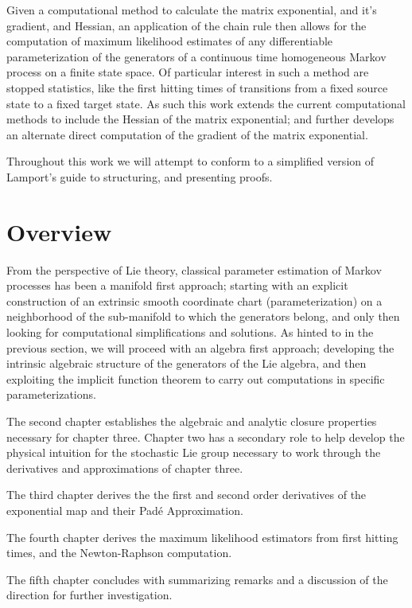 Given a computational method to calculate the matrix exponential, and it's 
gradient, and Hessian, an application of the chain rule then allows for the 
computation of maximum likelihood estimates of any differentiable
parameterization of the generators of a continuous time homogeneous Markov 
process on a finite state space. Of particular interest in such a method are stopped statistics, like the first hitting 
times of transitions from a fixed source state to a fixed target state. As such 
this work extends the current computational methods to include the Hessian of the 
matrix exponential; and further develops an alternate direct computation of the 
gradient of the matrix exponential.

Throughout this work we will attempt to conform to a simplified version of 
Lamport's guide to structuring, and presenting proofs\cite{lamport_how_2012}.
\section{Overview}
From the perspective of Lie theory, classical parameter estimation of Markov 
processes has been a manifold first approach; starting with an explicit 
construction of an extrinsic smooth coordinate chart (parameterization) on a 
neighborhood of the sub-manifold to which the generators belong, and only then 
looking for computational simplifications and solutions. As hinted to in the 
previous section, we will proceed with an algebra first approach; developing the 
intrinsic algebraic structure of the generators of the Lie algebra, and then 
exploiting the implicit function theorem to carry out computations in specific 
parameterizations.

The second chapter establishes the algebraic and analytic closure properties
necessary for chapter three. Chapter two has a secondary role to help develop the 
physical intuition for the stochastic Lie group necessary to work through the 
derivatives and approximations of chapter three.

The third chapter derives the the first and second order derivatives of the exponential
map and their Pad\'{e} Approximation.

The fourth chapter derives the maximum likelihood estimators from first hitting times, and the Newton-Raphson computation.

The fifth chapter concludes with summarizing remarks and a discussion of the direction
for further investigation.